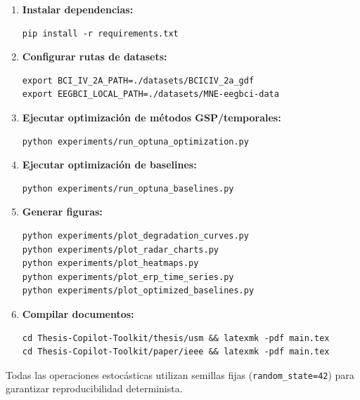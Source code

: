 \begin{enumerate}
    \item \textbf{Instalar dependencias:}
\begin{verbatim}
pip install -r requirements.txt
\end{verbatim}

    \item \textbf{Configurar rutas de datasets:}
\begin{verbatim}
export BCI_IV_2A_PATH=./datasets/BCICIV_2a_gdf
export EEGBCI_LOCAL_PATH=./datasets/MNE-eegbci-data
\end{verbatim}

    \item \textbf{Ejecutar optimización de métodos GSP/temporales:}
\begin{verbatim}
python experiments/run_optuna_optimization.py
\end{verbatim}

    \item \textbf{Ejecutar optimización de baselines:}
\begin{verbatim}
python experiments/run_optuna_baselines.py
\end{verbatim}

    \item \textbf{Generar figuras:}
\begin{verbatim}
python experiments/plot_degradation_curves.py
python experiments/plot_radar_charts.py
python experiments/plot_heatmaps.py
python experiments/plot_erp_time_series.py
python experiments/plot_optimized_baselines.py
\end{verbatim}

    \item \textbf{Compilar documentos:}
\begin{verbatim}
cd Thesis-Copilot-Toolkit/thesis/usm && latexmk -pdf main.tex
cd Thesis-Copilot-Toolkit/paper/ieee && latexmk -pdf main.tex
\end{verbatim}
\end{enumerate}

Todas las operaciones estocásticas utilizan semillas fijas (\texttt{random\_state=42}) para garantizar reproducibilidad determinista.
